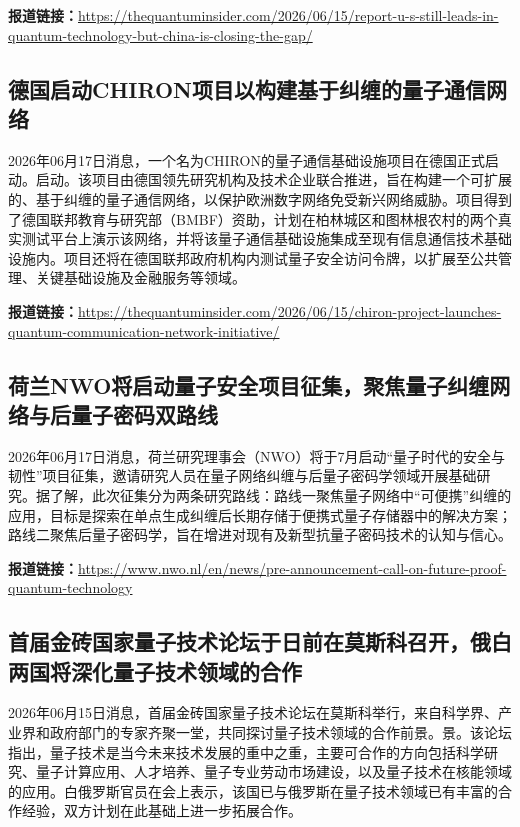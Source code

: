 \documentclass[12pt,a4paper]{ctexart}
\begin{document}
\noindent\textbf{报道链接：}\url{https://thequantuminsider.com/2026/06/15/report-u-s-still-leads-in-quantum-technology-but-china-is-closing-the-gap/}

\subsection{ 德国启动CHIRON项目以构建基于纠缠的量子通信网络 }

2026年06月17日消息，一个名为CHIRON的量子通信基础设施项目在德国正式启动。启动。该项目由德国领先研究机构及技术企业联合推进，旨在构建一个可扩展的、基于纠缠的量子通信网络，以保护欧洲数字网络免受新兴网络威胁。项目得到了德国联邦教育与研究部（BMBF）资助，计划在柏林城区和图林根农村的两个真实测试平台上演示该网络，并将该量子通信基础设施集成至现有信息通信技术基础设施内。项目还将在德国联邦政府机构内测试量子安全访问令牌，以扩展至公共管理、关键基础设施及金融服务等领域。

\noindent\textbf{报道链接：}\url{https://thequantuminsider.com/2026/06/15/chiron-project-launches-quantum-communication-network-initiative/}

\subsection{ 荷兰NWO将启动量子安全项目征集，聚焦量子纠缠网络与后量子密码双路线 }

2026年06月17日消息，荷兰研究理事会（NWO）将于7月启动“量子时代的安全与韧性”项目征集，邀请研究人员在量子网络纠缠与后量子密码学领域开展基础研究。据了解，此次征集分为两条研究路线：路线一聚焦量子网络中“可便携”纠缠的应用，目标是探索在单点生成纠缠后长期存储于便携式量子存储器中的解决方案；路线二聚焦后量子密码学，旨在增进对现有及新型抗量子密码技术的认知与信心。

\noindent\textbf{报道链接：}\url{https://www.nwo.nl/en/news/pre-announcement-call-on-future-proof-quantum-technology}

\subsection{ 首届金砖国家量子技术论坛于日前在莫斯科召开，俄白两国将深化量子技术领域的合作 }

2026年06月15日消息，首届金砖国家量子技术论坛在莫斯科举行，来自科学界、产业界和政府部门的专家齐聚一堂，共同探讨量子技术领域的合作前景。景。该论坛指出，量子技术是当今未来技术发展的重中之重，主要可合作的方向包括科学研究、量子计算应用、人才培养、量子专业劳动市场建设，以及量子技术在核能领域的应用。白俄罗斯官员在会上表示，该国已与俄罗斯在量子技术领域已有丰富的合作经验，双方计划在此基础上进一步拓展合作。
\end{document}
